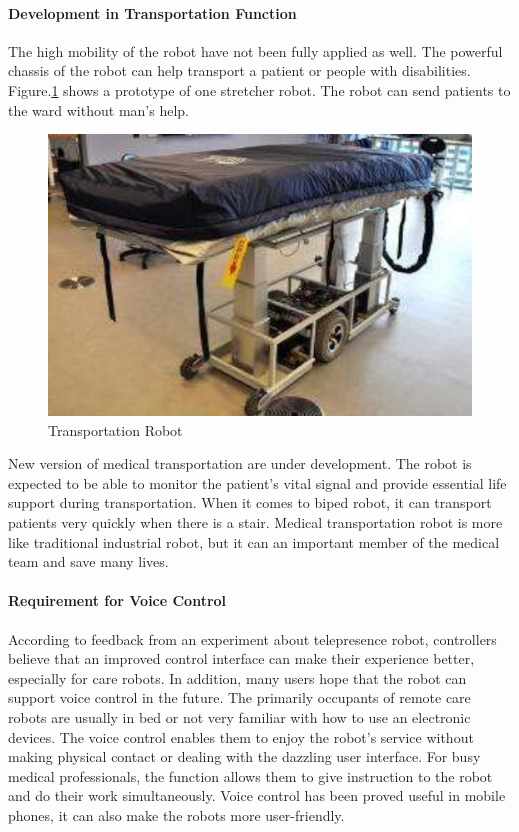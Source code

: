 \documentclass[a4paper]{article}
\begin{document}
\paragraph{Development in Transportation Function}
    The high mobility of the robot have not been fully applied as well. The powerful chassis of the robot can help transport a patient or people with disabilities\cite{32}. Figure.\ref{Transportation Robot} shows a prototype of one stretcher robot. The robot can send patients to the ward without man's help.
\begin{figure}[H]
    \centering
    \includegraphics[scale=0.25]{Transportation.png}
    \caption{Transportation Robot}
    \label{Transportation Robot}
\end{figure}
    New version of medical transportation are under development. The robot is expected to be able to monitor the patient's vital signal and provide essential life support during transportation. When it comes to biped robot, it can transport patients very quickly when there is a stair. Medical transportation robot is more like traditional industrial robot, but it can an important member of the medical team and save many lives.

\paragraph{Requirement for Voice Control} 
    According to feedback from an experiment about telepresence robot, controllers believe that an improved control interface can make their experience better, especially for care robots. In addition, many users hope that the robot can support voice control in the future. The primarily occupants of remote care robots are usually in bed or not very familiar with how to use an electronic devices. The voice control enables them to enjoy the robot's service without making physical contact or dealing with the dazzling user interface. For busy medical professionals, the function allows them to give instruction to the robot and do their work simultaneously. Voice control has been proved useful in mobile phones, it can also make the robots more user-friendly.
\end{document}
